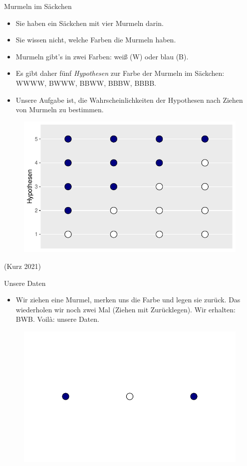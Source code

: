 \documentclass[
  ngerman,
  ignorenonframetext,
]{beamer}
\providecommand{\tightlist}{%
  \setlength{\itemsep}{0pt}\setlength{\parskip}{0pt}}
\begin{document}
\begin{frame}{Murmeln im Säckchen}
\protect\hypertarget{murmeln-im-suxe4ckchen}{}
\begin{itemize}
\item
  Sie haben ein Säckchen mit vier Murmeln darin.
\item
  Sie wissen nicht, welche Farben die Murmeln haben.
\item
  Murmeln gibt's in zwei Farben: weiß (W) oder blau (B).
\item
  Es gibt daher fünf \emph{Hypothesen} zur Farbe der Murmeln im
  Säckchen: WWWW, BWWW, BBWW, BBBW, BBBB.
\item
  Unsere Aufgabe ist, die Wahrscheinlichkeiten der Hypothesen nach
  Ziehen von Murmeln zu bestimmen.
\end{itemize}

\begin{figure}[H]
\includegraphics[width=0.2\linewidth]{unnamed-chunk-3-1} \end{figure}

(Kurz 2021)
\end{frame}

\begin{frame}{Unsere Daten}
\protect\hypertarget{unsere-daten}{}
\begin{itemize}
\tightlist
\item
  Wir ziehen eine Murmel, merken uns die Farbe und legen sie zurück. Das
  wiederholen wir noch zwei Mal (Ziehen mit Zurücklegen). Wir erhalten:
  BWB. Voilà: unsere Daten.
\end{itemize}

\begin{figure}[H]
\includegraphics[width=0.7\linewidth]{unnamed-chunk-4-1} \end{figure}
\end{frame}
\end{document}

